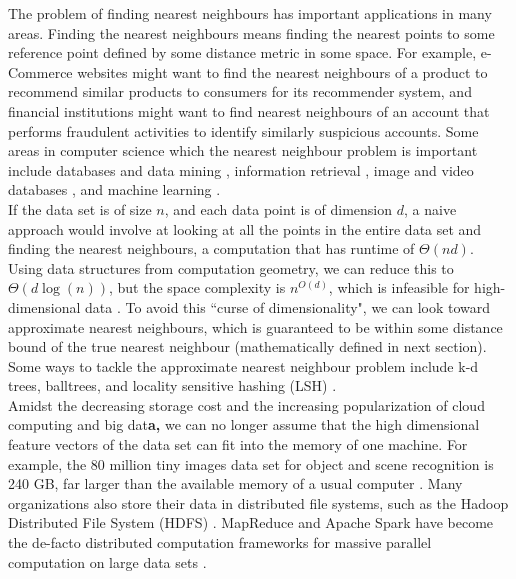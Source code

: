 \documentclass[letterpaper,twocolumn,10pt]{article}
\theoremstyle{definition}
\begin{document}
The problem of finding nearest neighbours has important applications in many areas. 
Finding the 
nearest neighbours means finding the nearest points to some reference point defined 
by some distance metric in some space. For example, e-Commerce websites might want 
to find the nearest neighbours of a product to recommend similar products to 
consumers for its recommender system, and financial institutions might want to find 
nearest neighbours of an account that performs fraudulent activities to identify 
similarly suspicious accounts. Some areas in computer science which the nearest 
neighbour problem is important include databases and data mining 
\cite{berkhin2006survey}, information retrieval \cite{croft2010search}, image and 
video databases \cite{faloutsos1994efficient,flickner1995query}, and machine 
learning \cite{weinberger2006distance}. \\

If the data set is of size $n$, and each data point is of dimension $d$, a naive 
approach would involve at looking at all the points in the entire data set and 
finding the nearest neighbours, a computation that has runtime of $\Theta(nd)$. 
Using data structures from computation geometry, we can reduce this to 
$\Theta(d\log(n))$, but the space complexity is $n^{O(d)}$, which is infeasible for 
high-dimensional data \cite{shalev2014understanding}. To avoid this ``curse of 
dimensionality", we can look toward approximate nearest neighbours, which is 
guaranteed to be within some distance bound of the true nearest neighbour 
(mathematically defined in next section). Some ways to tackle the approximate 
nearest neighbour problem include k-d trees, balltrees, and locality sensitive 
hashing (LSH) \cite{shakhnarovich2006nearest}. \\

Amidst the decreasing storage cost and the increasing popularization of cloud 
computing and big dat\textbf{a, }we can no longer assume that the high dimensional feature 
vectors of the data set can fit into the memory of one machine. For example, the 80 
million tiny images data set for object and scene recognition is 240 GB, far larger 
than the available memory of a usual computer \cite{torralba200880}. Many 
organizations also store their data in distributed file systems, such as the Hadoop 
Distributed File System (HDFS) \cite{shvachko2010hadoop}. MapReduce 
\cite{dean2008mapreduce} and Apache Spark \cite{zaharia2010spark} have become the 
de-facto distributed computation frameworks for massive parallel computation on 
large data sets \cite{suri2011counting}. \\
\end{document}
